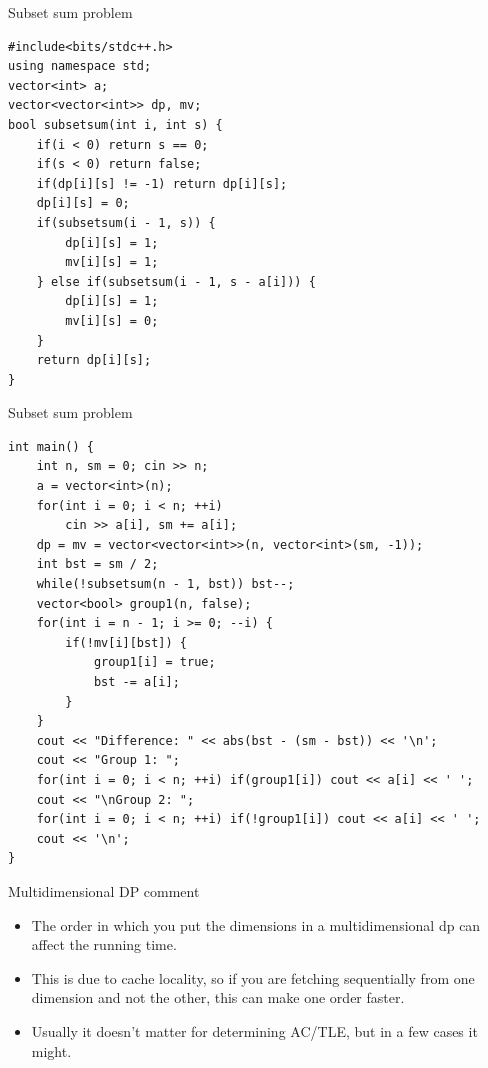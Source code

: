 \documentclass{beamer}
\begin{document}
\begin{frame}{Subset sum problem}
    \begin{verbatim}
#include<bits/stdc++.h>
using namespace std;
vector<int> a;
vector<vector<int>> dp, mv;
bool subsetsum(int i, int s) {
	if(i < 0) return s == 0;
	if(s < 0) return false;
    if(dp[i][s] != -1) return dp[i][s];
    dp[i][s] = 0;
    if(subsetsum(i - 1, s)) {
        dp[i][s] = 1;
        mv[i][s] = 1;
    } else if(subsetsum(i - 1, s - a[i])) {
        dp[i][s] = 1;
        mv[i][s] = 0;
    }
	return dp[i][s];
}
    \end{verbatim}
\end{frame}

\begin{frame}{Subset sum problem}
    \begin{verbatim}
int main() {
	int n, sm = 0; cin >> n;
	a = vector<int>(n);
	for(int i = 0; i < n; ++i)
		cin >> a[i], sm += a[i];
	dp = mv = vector<vector<int>>(n, vector<int>(sm, -1));
	int bst = sm / 2;
	while(!subsetsum(n - 1, bst)) bst--;
	vector<bool> group1(n, false);
	for(int i = n - 1; i >= 0; --i) {
		if(!mv[i][bst]) {
			group1[i] = true;
			bst -= a[i];
		}
	}
	cout << "Difference: " << abs(bst - (sm - bst)) << '\n';
	cout << "Group 1: ";
	for(int i = 0; i < n; ++i) if(group1[i]) cout << a[i] << ' ';
	cout << "\nGroup 2: ";
	for(int i = 0; i < n; ++i) if(!group1[i]) cout << a[i] << ' ';
	cout << '\n';
}
    \end{verbatim}
\end{frame}

\begin{frame}[plain]{Multidimensional DP comment}
    \vspace{10pt}

    \begin{itemize}
		\item The order in which you put the dimensions in a multidimensional dp can affect the running time.
		\item This is due to cache locality, so if you are fetching sequentially from one dimension and not the other, this can make one order faster.    
        \item Usually it doesn't matter for determining AC/TLE, but in a few cases it might.
    \end{itemize}
\end{frame}
\end{document}
